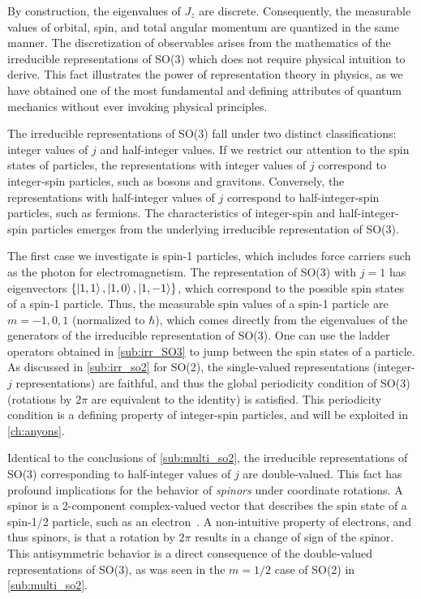 By construction, the eigenvalues of $J_z$ are discrete. Consequently, the measurable values of orbital, spin, and total angular momentum are quantized in the same manner. The discretization of observables arises from the mathematics of the irreducible representations of SO(3) which does not require physical intuition to derive. This fact illustrates the power of representation theory in physics, as we have obtained one of the most fundamental and defining attributes of quantum mechanics without ever invoking physical principles.

The irreducible representations of SO(3) fall under two distinct classifications: integer values of $j$ and half-integer values. If we restrict our attention to the spin states of particles, the representations with integer values of $j$ correspond to integer-spin particles, such as bosons and gravitons. Conversely, the representations with half-integer values of $j$ correspond to half-integer-spin particles, such as fermions. The characteristics of integer-spin and half-integer-spin particles emerges from the underlying irreducible representation of SO(3).

The first case we investigate is spin-1 particles, which includes force carriers such as the photon for electromagnetism. The representation of SO(3) with $j=1$ has eigenvectors $\left\{ \ket{1,1}, \ket{1,0}, \ket{1,-1} \right\}$, which correspond to the possible spin states of a spin-1 particle. Thus, the measurable spin values of a spin-1 particle are $m=-1,0,1$ (normalized to $\hbar$), which comes directly from the eigenvalues of the generators of the irreducible representation of SO(3). One can use the ladder operators obtained in \cref{sub:irr_SO3} to jump between the spin states of a particle. As discussed in \cref{sub:irr_so2} for SO(2), the single-valued representations (integer-$j$ representations) are faithful, and thus the global periodicity condition of SO(3) (rotations by $2\pi$ are equivalent to the identity) is satisfied. This periodicity condition is a defining property of integer-spin particles, and will be exploited in \cref{ch:anyons}.

Identical to the conclusions of \cref{sub:multi_so2}, the irreducible representations of SO(3) corresponding to half-integer values of $j$ are double-valued. This fact has profound implications for the behavior of \textit{spinors} under coordinate rotations. A spinor is a 2-component complex-valued vector that describes the spin state of a spin-1/2 particle, such as an electron~\cite{Griffiths2018}. A non-intuitive property of electrons, and thus spinors, is that a rotation by $2\pi$ results in a change of sign of the spinor. This antisymmetric behavior is a direct consequence of the double-valued representations of SO(3), as was seen in the $m=1/2$ case of SO(2) in \cref{sub:multi_so2}.

